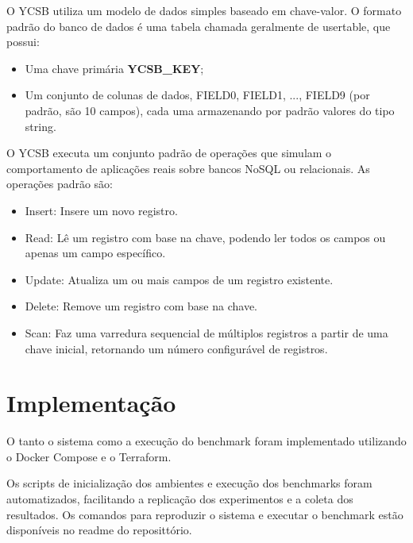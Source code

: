	O YCSB utiliza um modelo de dados simples baseado em chave-valor. O formato padrão do banco de dados é uma tabela chamada geralmente de usertable, que possui:
    \begin{itemize}
		\item Uma chave primária \textbf{YCSB\_KEY};
		\item Um conjunto de colunas de dados, FIELD0, FIELD1, ..., FIELD9 (por padrão, são 10 campos), cada uma armazenando por padrão valores do tipo string.
	\end{itemize}	

	O YCSB executa um conjunto padrão de operações que simulam o comportamento de aplicações reais sobre bancos NoSQL ou relacionais. As operações padrão são:
	\begin{itemize}
		\item Insert: Insere um novo registro.
		\item Read: Lê um registro com base na chave, podendo ler todos os campos ou apenas um campo específico.
		\item Update: Atualiza um ou mais campos de um registro existente.
		\item Delete: Remove um registro com base na chave.
		\item Scan: Faz uma varredura sequencial de múltiplos registros a partir de uma chave inicial, retornando um número configurável de registros.
	\end{itemize}

\section{Implementação}

O tanto o sistema como a execução do benchmark foram implementado utilizando o Docker Compose e o Terraform.

Os scripts de inicialização dos ambientes e execução dos benchmarks foram automatizados,
facilitando a replicação dos experimentos e a coleta dos resultados. 
Os comandos para reproduzir o sistema e executar o benchmark estão disponíveis no readme do reposittório.

